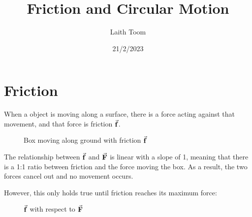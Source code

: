 \documentclass{article}
\title{Friction and Circular Motion}
\author{Laith Toom}
\date{21/2/2023}
\begin{document}
\maketitle
\newpage

\section{Friction}
When a object is moving along a surface, there is a force acting 
against that movement, and that force is friction $\va{f}$.

\begin{figure}[h]
    \centering
    \caption{Box moving along ground with friction $\va{f}$}
\end{figure}

The relationship between $\va{f}$ and $\va{F}$ is linear with a slope of 1, meaning that
there is a 1:1 ratio between friction and the force moving the box. As a result, the two 
forces cancel out and no movement occurs. 

However, this only holds true until friction reaches its maximum force:
\begin{figure}[h]
    \centering 
    \vspace{-1em}
    \caption{$\va{f}$ with respect to $\va{F}$}
    \vspace{0.8em}
\end{figure}
\end{document}
